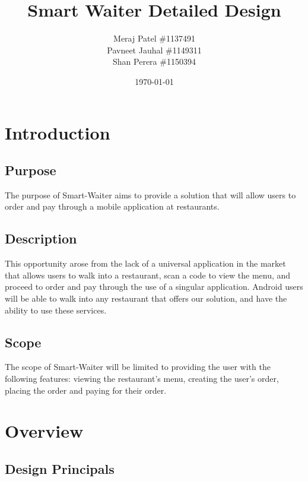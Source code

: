 \documentclass[12pt, titlepage]{article}
\begin{document}
\title{Smart Waiter Detailed Design} 
\author{Meraj Patel \#1137491 \\ Pavneet Jauhal \#1149311\\ Shan Perera \#1150394}
\date{\today}
\maketitle

\tableofcontents 

\listoffigures

\listoftables


\pagebreak

\section{Introduction}

\subsection{Purpose}
The purpose of Smart-Waiter aims to provide a solution that will allow users to order and pay through a mobile application at restaurants. 

\subsection{Description}
This opportunity arose from the lack of a universal application in the market that allows users to walk into a restaurant, scan a code to view the menu, and proceed to order and pay through the use of a singular application. Android users will be able to walk into any restaurant that offers our solution, and have the ability to use these services.

\subsection{Scope}
The scope of Smart-Waiter will be limited to providing the user with the following features: viewing the restaurant's menu, creating the user's order, placing the order and paying for their order. 
 
\section{Overview}

\subsection{Design Principals}
\end{document}
